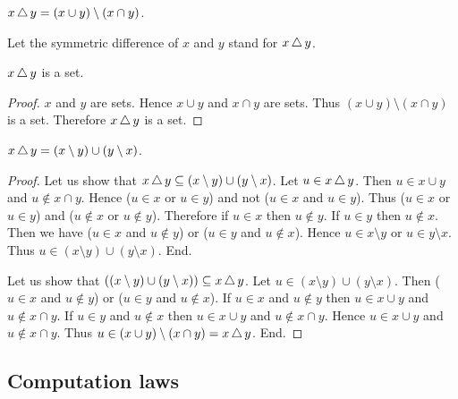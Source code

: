 \documentclass[../../set-theory.ftl.tex]{subfiles}
\begin{document}
  \begin{forthel}
    \begin{definition}
      $x \mathop{\triangle} y = (x \cup y) \setminus (x \cap y)$.
    \end{definition}

    Let the symmetric difference of $x$ and $y$ stand for $x \mathop{\triangle} y$.

    \begin{lemma}
      $x \mathop{\triangle} y$ is a set.
    \end{lemma}
    \begin{proof}
      $x$ and $y$ are sets.
      Hence $x \cup y$ and $x \cap y$ are sets.
      Thus $(x \cup y) \setminus (x \cap y)$ is a set.
      Therefore $x \mathop{\triangle} y$ is a set.
    \end{proof}

    \begin{proposition}\label{SetTheory_01_04_470605}
      $x \mathop{\triangle} y = (x \setminus y) \cup (y \setminus x)$.
    \end{proposition}
    \begin{proof}
      Let us show that $x \mathop{\triangle} y \subseteq (x \setminus y) \cup (y \setminus x)$.
        Let $u \in x \mathop{\triangle} y$.
        Then $u \in x \cup y$ and $u \notin x \cap y$.
        Hence ($u \in x$ or $u \in y$) and not ($u \in x$ and $u \in y$).
        Thus ($u \in x$ or $u \in y$) and ($u \notin x$ or $u \notin y$).
        Therefore if $u \in x$ then $u \notin y$.
        If $u \in y$ then $u \notin x$.
        Then we have ($u \in x$ and $u \notin y$) or ($u \in y$ and
        $u \notin x$).
        Hence $u \in x \setminus y$ or $u \in y \setminus x$.
        Thus $u \in (x \setminus y) \cup (y \setminus x)$.
      End.

      Let us show that $((x \setminus y) \cup (y \setminus x)) \subseteq x \mathop{\triangle} y$.
        Let $u \in (x \setminus y) \cup (y \setminus x)$.
        Then ($u \in x$ and $u \notin y$) or ($u \in y$ and $u \notin x$).
        If $u \in x$ and $u \notin y$ then $u \in x \cup y$ and
        $u \notin x \cap y$.
        If $u \in y$ and $u \notin x$ then $u \in x \cup y$ and
        $u \notin x \cap y$.
        Hence $u \in x \cup y$ and $u \notin x \cap y$.
        Thus $u \in (x \cup y) \setminus (x \cap y) = x \mathop{\triangle} y$.
      End.
    \end{proof}
  \end{forthel}


  \subsection{Computation laws}
\end{document}
